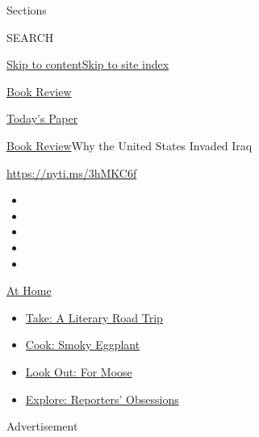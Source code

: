Sections

SEARCH

\protect\hyperlink{site-content}{Skip to
content}\protect\hyperlink{site-index}{Skip to site index}

\href{https://www.nytimes.com/section/books/review}{Book Review}

\href{https://myaccount.nytimes.com/auth/login?response_type=cookie\&client_id=vi}{}

\href{https://www.nytimes.com/section/todayspaper}{Today's Paper}

\href{/section/books/review}{Book Review}\textbar{}Why the United States
Invaded Iraq

\url{https://nyti.ms/3hMKC6f}

\begin{itemize}
\item
\item
\item
\item
\item
\end{itemize}

\href{https://www.nytimes.com/spotlight/at-home?action=click\&pgtype=Article\&state=default\&region=TOP_BANNER\&context=at_home_menu}{At
Home}

\begin{itemize}
\tightlist
\item
  \href{https://www.nytimes.com/2020/07/28/books/time-for-a-literary-road-trip.html?action=click\&pgtype=Article\&state=default\&region=TOP_BANNER\&context=at_home_menu}{Take:
  A Literary Road Trip}
\item
  \href{https://www.nytimes.com/2020/07/29/magazine/bored-with-your-home-cooking-some-smoky-eggplant-will-fix-that.html?action=click\&pgtype=Article\&state=default\&region=TOP_BANNER\&context=at_home_menu}{Cook:
  Smoky Eggplant}
\item
  \href{https://www.nytimes.com/2020/07/27/travel/moose-michigan-isle-royale.html?action=click\&pgtype=Article\&state=default\&region=TOP_BANNER\&context=at_home_menu}{Look
  Out: For Moose}
\item
  \href{https://www.nytimes.com/interactive/2020/at-home/even-more-reporters-editors-diaries-lists-recommendations.html?action=click\&pgtype=Article\&state=default\&region=TOP_BANNER\&context=at_home_menu}{Explore:
  Reporters' Obsessions}
\end{itemize}

Advertisement

